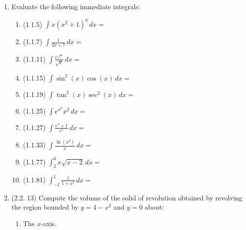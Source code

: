 \documentclass[12pt]{article}
\newcommand{\di}{\displaystyle}
\begin{document}
\begin{enumerate}
\item Evaluate the following immediate integrals:
\begin{enumerate}
\item (1.1.5) $\di \int x(x^2+1)^8\,dx = $

\bigskip

\bigskip

\item (1.1.7) $\di \int \frac{1}{2x+7}\,dx = $

\bigskip

\bigskip

\item (1.1.11) $\di \int \frac{e^{\sqrt{x}}}{\sqrt{x}}\,dx = $

\bigskip

\bigskip

\item (1.1.15) $\di \int \sin^2(x)\cos(x)\,dx = $

\bigskip

\bigskip

\item (1.1.19) $\di \int \tan^2(x)\sec^2(x)\,dx = $

\bigskip

\bigskip

\item (1.1.25) $\di \int e^{x^3}x^2\,dx = $

\bigskip

\bigskip

\item (1.1.27) $\di \int\frac{e^x+1}{e^x}\,dx = $

\bigskip

\bigskip

\item (1.1.33) $\di \int\frac{\ln(x^3)}{x}\,dx = $

\bigskip

\bigskip

\item (1.1.77) $\di \int_2^6x\sqrt{x-2}\,dx = $

\bigskip

\bigskip

\item (1.1.81) $\di \int_{-1}^1\frac{1}{1+x^2}\,dx = $
\end{enumerate}
\newpage

\item (2.2. 13) Compute the volume of the solid of revolution obtained by revolving the region bounded by  $y=4-x^2$ and $y=0$ about:
\begin{enumerate}
\item The $x$-axis.


\end{enumerate}
\end{enumerate}
\end{document}
